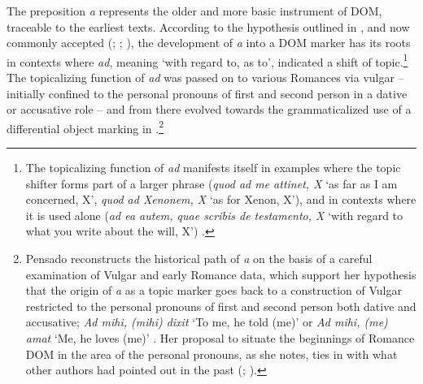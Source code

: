 \documentclass[output=paper]{LSP/langsci}
\begin{document}
 The preposition \textit{a} represents the older and more basic instrument of  DOM, traceable to the earliest texts. According to the hypothesis outlined in \citet{Pensado1995Creacion}, and now commonly accepted (\citealt{Torrego1999Gramatica}; \citealt{Leonetti2004Specificity}; \citealt{Iemmolo2010Topicality}), the development of \textit{a} into a DOM marker has its roots in contexts where  \textit{ad}, meaning ‘with regard to, as to’, indicated a shift of topic.\footnote{The topicalizing function of  \textit{ad} manifests itself in examples where the topic shifter forms part of a larger phrase (\textit{quod ad me attinet, X} ‘as far as I am concerned, X’, \textit{quod ad Xenonem, X} ‘as for Xenon, X’), and in contexts where it is used alone (\textit{ad ea autem, quae scribis de testamento, X} ‘with regard to what you write about the will, X’) \citep{Pensado1995Creacion}.} The topicalizing function of \textit{ad} was passed on to various Romances via vulgar  – initially confined to the personal pronouns of first and second person in a dative or accusative role – and from there evolved towards the grammaticalized use of a differential object marking in  \citep{Pensado1995Creacion}.\footnote{Pensado reconstructs the historical path of  \textit{a} on the basis of a careful examination of Vulgar  and early Romance data, which support her hypothesis that the origin of \textit{a} as a topic marker goes back to a construction of Vulgar  restricted to the personal pronouns of first and second person both dative and accusative; \cf \textit{Ad mihi, (mihi) dixit} ‘To me, he told (me)’ or \textit{Ad mihi, (me) amat} ‘Me, he loves (me)’ \citep[203]{Pensado1995Creacion}. Her proposal to situate the beginnings of Romance DOM in the area of the personal pronouns, as she notes, ties in with what other authors had pointed out in the past (\citealt{Meier1948Acusativo}; \citealt{Rohlfs1971Autour}).}
\end{document}

